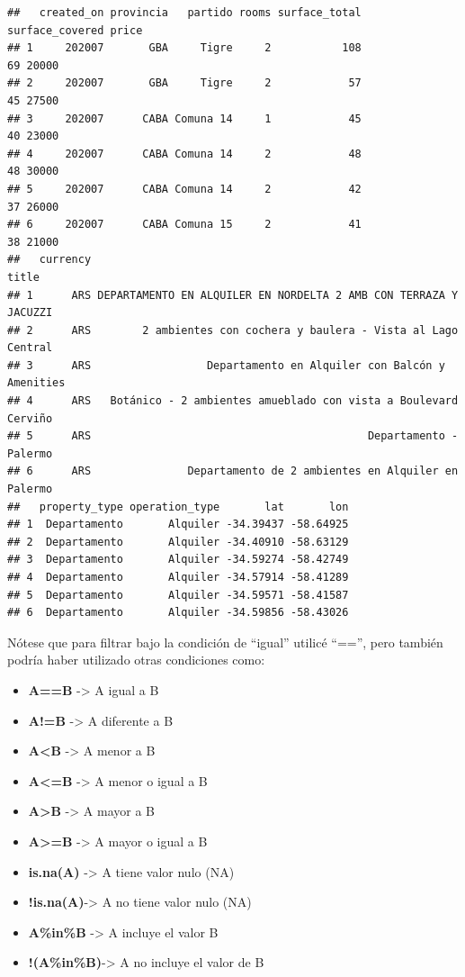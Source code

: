 \documentclass[
  spanish,
]{book}
\providecommand{\tightlist}{%
  \setlength{\itemsep}{0pt}\setlength{\parskip}{0pt}}
\begin{document}
\begin{verbatim}
##   created_on provincia   partido rooms surface_total surface_covered price
## 1     202007       GBA     Tigre     2           108              69 20000
## 2     202007       GBA     Tigre     2            57              45 27500
## 3     202007      CABA Comuna 14     1            45              40 23000
## 4     202007      CABA Comuna 14     2            48              48 30000
## 5     202007      CABA Comuna 14     2            42              37 26000
## 6     202007      CABA Comuna 15     2            41              38 21000
##   currency                                                            title
## 1      ARS DEPARTAMENTO EN ALQUILER EN NORDELTA 2 AMB CON TERRAZA Y JACUZZI
## 2      ARS        2 ambientes con cochera y baulera - Vista al Lago Central
## 3      ARS                  Departamento en Alquiler con Balcón y Amenities
## 4      ARS   Botánico - 2 ambientes amueblado con vista a Boulevard Cerviño
## 5      ARS                                           Departamento - Palermo
## 6      ARS               Departamento de 2 ambientes en Alquiler en Palermo
##   property_type operation_type       lat       lon
## 1  Departamento       Alquiler -34.39437 -58.64925
## 2  Departamento       Alquiler -34.40910 -58.63129
## 3  Departamento       Alquiler -34.59274 -58.42749
## 4  Departamento       Alquiler -34.57914 -58.41289
## 5  Departamento       Alquiler -34.59571 -58.41587
## 6  Departamento       Alquiler -34.59856 -58.43026
\end{verbatim}

Nótese que para filtrar bajo la condición de ``igual'' utilicé ``=='', pero también podría haber utilizado otras condiciones como:

\begin{itemize}
\tightlist
\item
  \textbf{A==B} -\textgreater{} A igual a B
\item
  \textbf{A!=B} -\textgreater{} A diferente a B
\item
  \textbf{A\textless B} -\textgreater{} A menor a B
\item
  \textbf{A\textless=B} -\textgreater{} A menor o igual a B
\item
  \textbf{A\textgreater B} -\textgreater{} A mayor a B
\item
  \textbf{A\textgreater=B} -\textgreater{} A mayor o igual a B
\item
  \textbf{is.na(A)} -\textgreater{} A tiene valor nulo (NA)
\item
  \textbf{!is.na(A)}-\textgreater{} A no tiene valor nulo (NA)
\item
  \textbf{A\%in\%B} -\textgreater{} A incluye el valor B
\item
  \textbf{!(A\%in\%B)}-\textgreater{} A no incluye el valor de B
\end{itemize}
\end{document}
